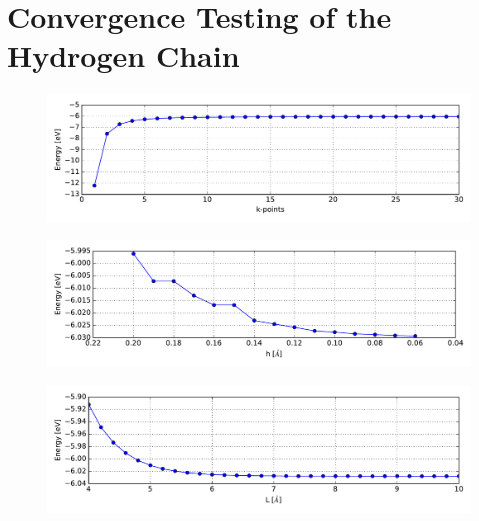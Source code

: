 \section{Convergence Testing of the Hydrogen Chain}

\begin{figure}[!h]
	\centering
	\includegraphics[width = 13cm]{Images/Hydrogen/convergence/kpts-energy}
	\caption{}
	\label{}
\end{figure}
\begin{figure}[!h]
	\centering
	\includegraphics[width = 13cm]{Images/Hydrogen/convergence/gridspacing-energy}
	\caption{}
	\label{}
\end{figure}
\begin{figure}[!h]
	\centering
	\includegraphics[width = 13cm]{Images/Hydrogen/convergence/unit_cell_width}
	\caption{}
	\label{}
\end{figure}

